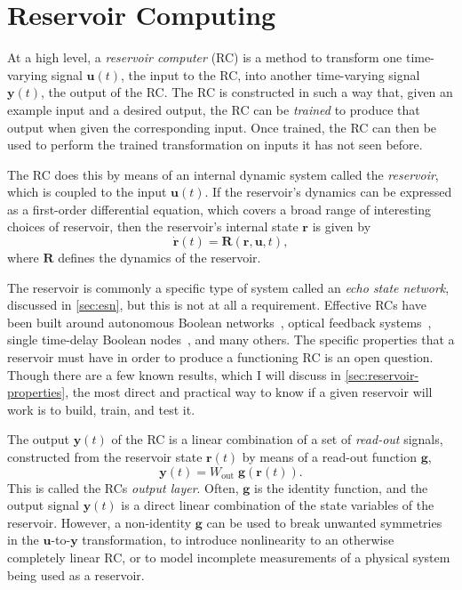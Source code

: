 \chapter{Reservoir Computing}\label{ch:reservoir-computing}

At a high level, a \emph{reservoir computer} (RC) is a method to
transform one time-varying signal $\bm{u}(t)$, the input to the RC,
into another time-varying signal $\bm{y}(t)$, the output of the
RC. The RC is constructed in such a way that, given an example input
and a desired output, the RC can be \emph{trained} to produce that
output when given the corresponding input. Once trained, the RC can
then be used to perform the trained transformation on inputs it has
not seen before.

The RC does this by means of an internal dynamic system called the
\emph{reservoir}, which is coupled to the input $\bm{u}(t)$. If the
reservoir's dynamics can be expressed as a first-order differential
equation, which covers a broad range of interesting choices of
reservoir, then the reservoir's internal state $\bm{r}$ is given by
\begin{equation}
  \label{eq:reservoir}
  \dot{\mathbf{r}}(t) = \mathbf{R}\left(\mathbf{r}, \mathbf{u}, t\right),
\end{equation}
where $\mathbf{R}$ defines the dynamics of the reservoir.

The reservoir is commonly a specific type of system called an
\emph{echo state network}, discussed in \cref{sec:esn}, but this is
not at all a requirement. Effective RCs have been built around
autonomous Boolean networks~\cite{canaday2018}, optical feedback
systems~\cite{antonik2016}, single time-delay Boolean
nodes~\cite{haynes2015}, and many others. The specific properties that
a reservoir must have in order to produce a functioning RC is an open
question. Though there are a few known results, which I will discuss
in \cref{sec:reservoir-properties}, the most direct and practical way
to know if a given reservoir will work is to build, train, and test
it.

The output $\bm{y}(t)$ of the RC is a linear
combination of a set of \emph{read-out} signals, constructed from the
reservoir state $\bm{r}(t)$ by means of a read-out function $\bm{g}$,
\begin{equation}
  \label{eq:output}
  \bm{y}(t) = W_\text{out}\;\bm{g}\left(\bm{r}(t)\right).
\end{equation}
This is called the RCs \emph{output layer}. Often, $\bm{g}$ is the
identity function, and the output signal $\bm{y}(t)$ is a direct
linear combination of the state variables of the reservoir. However, a
non-identity $\bm{g}$ can be used to break unwanted symmetries in the
$\bm{u}$-to-$\bm{y}$ transformation, to introduce nonlinearity to an
otherwise completely linear RC, or to model incomplete measurements of
a physical system being used as a reservoir.

